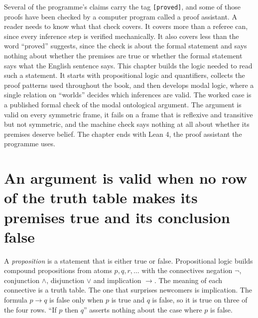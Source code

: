Several of the programme's claims carry the tag \texttt{[proved]}, and some of those proofs have been checked by a computer program called a proof assistant. A reader needs to know what that check covers. It covers more than a referee can, since every inference step is verified mechanically. It also covers less than the word ``proved'' suggests, since the check is about the formal statement and says nothing about whether the premises are true or whether the formal statement says what the English sentence says. This chapter builds the logic needed to read such a statement. It starts with propositional logic and quantifiers, collects the proof patterns used throughout the book, and then develops modal logic, where a single relation on ``worlds'' decides which inferences are valid. The worked case is a published formal check of the modal ontological argument. The argument is valid on every symmetric frame, it fails on a frame that is reflexive and transitive but not symmetric, and the machine check says nothing at all about whether its premises deserve belief. The chapter ends with Lean 4, the proof assistant the programme uses.

\section{An argument is valid when no row of the truth table makes its premises true and its conclusion false}\label{sec:ch10:prop}

A \emph{proposition} is a statement that is either true or false. Propositional logic builds compound propositions from atoms $p,q,r,\dots$ with the connectives negation $\neg$, conjunction $\wedge$, disjunction $\vee$ and implication $\to$. The meaning of each connective is a truth table. The one that surprises newcomers is implication. The formula $p\to q$ is false only when $p$ is true and $q$ is false, so it is true on three of the four rows. ``If $p$ then $q$'' asserts nothing about the case where $p$ is false.

